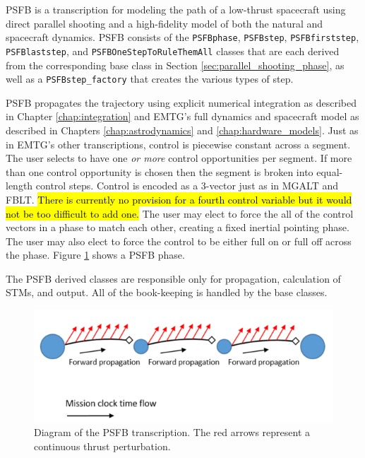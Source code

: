 \ac{PSFB} is a transcription for modeling the path of a low-thrust spacecraft using direct parallel shooting and a high-fidelity model of both the natural and spacecraft dynamics. \ac{PSFB} consists of the \texttt{PSFBphase}, \texttt{PSFBstep}, \texttt{PSFBfirststep}, \texttt{PSFBlaststep}, and \texttt{PSFBOneStepToRuleThemAll} classes that are each derived from the corresponding base class in Section \ref{sec:parallel_shooting_phase}, as well as a \texttt{PSFBstep\_factory} that creates the various types of step.

\ac{PSFB} propagates the trajectory using explicit numerical integration as described in Chapter \ref{chap:integration} and \ac{EMTG}'s full dynamics and spacecraft model as described in Chapters \ref{chap:astrodynamics} and \ref{chap:hardware_models}. Just as in \ac{EMTG}'s other transcriptions, control is piecewise constant across a segment. The user selects to have one \textit{or more} control opportunities per segment. If more than one control opportunity is chosen then the segment is broken into equal-length control steps. Control is encoded as a 3-vector just as in \ac{MGALT} and \ac{FBLT}. \hl{There is currently no provision for a fourth control variable but it would not be too difficult to add one.} The user may elect to force the all of the control vectors in a phase to match each other, creating a fixed inertial pointing phase. The user may also elect to force the control to be either full on or full off across the phase. Figure \ref{fig:PSFB} shows a \ac{PSFB} phase.

The \ac{PSFB} derived classes are responsible only for propagation, calculation of \ac{STM}s, and output. All of the book-keeping is handled by the base classes.

\begin{figure}
	\centering
	\includegraphics[width=0.8\linewidth]{./mission/PSFB.png}
	\caption{\label{fig:PSFB} Diagram of the \ac{PSFB} transcription. The red arrows represent a continuous thrust perturbation.}
\end{figure}

\FloatBarrier

